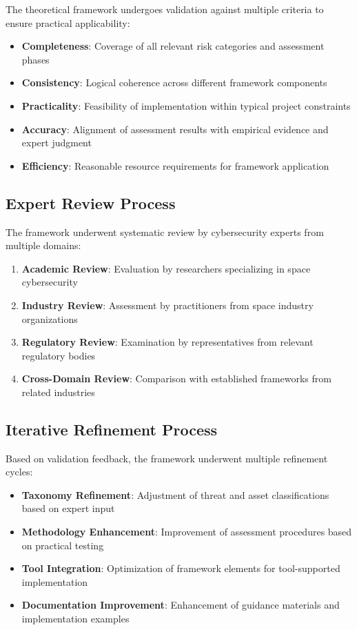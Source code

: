 \documentclass[binding=0.6cm]{sapthesis}
\begin{document}
The theoretical framework undergoes validation against multiple criteria to ensure practical applicability:

\begin{itemize}
    \item \textbf{Completeness}: Coverage of all relevant risk categories and assessment phases
    \item \textbf{Consistency}: Logical coherence across different framework components
    \item \textbf{Practicality}: Feasibility of implementation within typical project constraints
    \item \textbf{Accuracy}: Alignment of assessment results with empirical evidence and expert judgment
    \item \textbf{Efficiency}: Reasonable resource requirements for framework application
\end{itemize}

\subsection{Expert Review Process}

The framework underwent systematic review by cybersecurity experts from multiple domains:

\begin{enumerate}
    \item \textbf{Academic Review}: Evaluation by researchers specializing in space cybersecurity
    \item \textbf{Industry Review}: Assessment by practitioners from space industry organizations
    \item \textbf{Regulatory Review}: Examination by representatives from relevant regulatory bodies
    \item \textbf{Cross-Domain Review}: Comparison with established frameworks from related industries
\end{enumerate}

\subsection{Iterative Refinement Process}

Based on validation feedback, the framework underwent multiple refinement cycles:

\begin{itemize}
    \item \textbf{Taxonomy Refinement}: Adjustment of threat and asset classifications based on expert input
    \item \textbf{Methodology Enhancement}: Improvement of assessment procedures based on practical testing
    \item \textbf{Tool Integration}: Optimization of framework elements for tool-supported implementation
    \item \textbf{Documentation Improvement}: Enhancement of guidance materials and implementation examples
\end{itemize}
\end{document}
